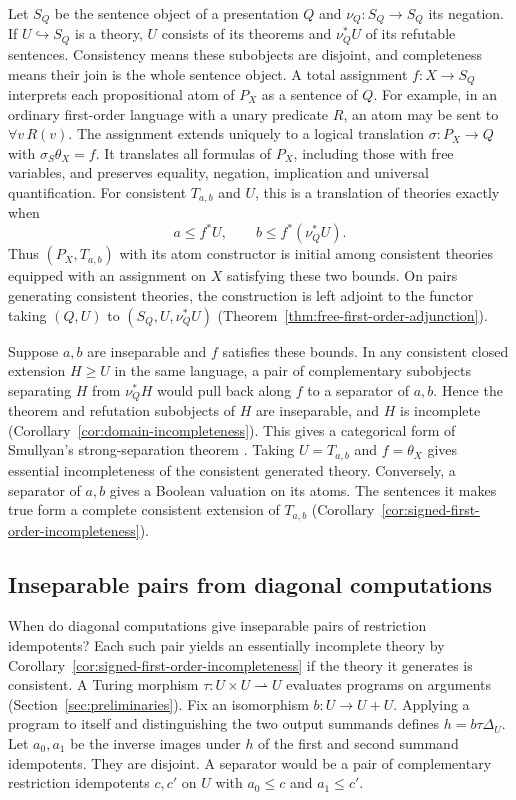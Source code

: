 Let $S_Q$ be the sentence object of a presentation $Q$ and
$\nu_Q:S_Q\to S_Q$ its negation. If $U\hookrightarrow S_Q$ is a theory,
$U$ consists of its theorems and $\nu_Q^*U$ of its refutable sentences.
Consistency means these subobjects are disjoint, and completeness means
their join is the whole sentence object.
A total assignment $f:X\to S_Q$ interprets each propositional atom of
$P_X$ as a sentence of $Q$. For example, in an ordinary first-order
language with a unary predicate $R$, an atom may be sent to
$\forall v\,R(v)$. The assignment extends uniquely to a logical
translation $\sigma:P_X\to Q$ with $\sigma_S\theta_X=f$. It translates
all formulas of $P_X$, including those with free
variables, and preserves equality, negation, implication and universal
quantification. For consistent
$T_{a,b}$ and $U$, this is a translation of theories exactly when
\[
                  a\le f^*U,\qquad b\le f^*(\nu_Q^*U).
\]
Thus $(P_X,T_{a,b})$ with its atom constructor is initial among
consistent theories equipped with an assignment on $X$ satisfying these
two bounds. On pairs
generating consistent theories, the construction is left adjoint to
the functor taking $(Q,U)$ to $(S_Q,U,\nu_Q^*U)$
(Theorem~\ref{thm:free-first-order-adjunction}).

Suppose $a,b$ are inseparable and $f$ satisfies these bounds. In any
consistent closed extension
$H\ge U$ in the same language, a pair of complementary subobjects
separating $H$ from $\nu_Q^*H$ would pull back along $f$ to a separator
of $a,b$. Hence the theorem and refutation subobjects of $H$ are
inseparable, and $H$ is incomplete
(Corollary~\ref{cor:domain-incompleteness}). This gives a categorical
form of Smullyan's strong-separation theorem
\cite[Chapter~III, Theorem~23(b)]{Smullyan}.
Taking $U=T_{a,b}$ and $f=\theta_X$ gives essential incompleteness of the consistent
generated theory. Conversely, a separator of $a,b$ gives a Boolean
valuation on its atoms. The sentences it makes true form a complete
consistent extension of $T_{a,b}$
(Corollary~\ref{cor:signed-first-order-incompleteness}).

\subsection{Inseparable pairs from diagonal computations}

When do diagonal computations give inseparable pairs of restriction
idempotents? Each such pair yields an essentially incomplete theory by
Corollary~\ref{cor:signed-first-order-incompleteness} if the theory it
generates is consistent. A Turing morphism
$\tau:U\times U\rightharpoonup U$ evaluates programs on arguments
(Section~\ref{sec:preliminaries}). Fix an isomorphism $b:U\to U+U$.
Applying a program to itself and distinguishing the two output summands
defines $h=b\tau\Delta_U$. Let $a_0,a_1$ be the inverse images under
$h$ of the first and second summand idempotents. They are disjoint.
A separator would be a pair of complementary restriction idempotents
$c,c'$ on $U$ with $a_0\le c$ and $a_1\le c'$.

